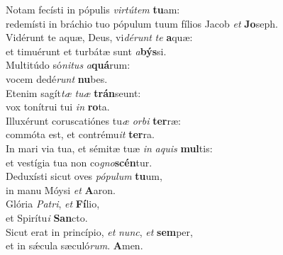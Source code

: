 \evenverse Notam fecísti in pópulis \textit{vir}\textit{tú}\textit{tem} \textbf{tu}am:~\*\\
\evenverse redemísti in bráchio tuo pópulum tuum fílios Jacob \textit{et} \textbf{Jo}seph.\\
\oddverse Vidérunt te aquæ, Deus, vi\textit{dé}\textit{runt} \textit{te} \textbf{a}quæ:~\*\\
\oddverse et timuérunt et turbátæ sunt \textit{a}\textbf{býs}si.\\
\evenverse Multitúdo só\textit{ni}\textit{tus} \textit{a}\textbf{quá}rum:~\*\\
\evenverse vocem dedé\textit{runt} \textbf{nu}bes.\\
\oddverse Etenim sagít\textit{tæ} \textit{tu}\textit{æ} \textbf{trán}seunt:~\*\\
\oddverse vox tonítrui tui \textit{in} \textbf{ro}ta.\\
\evenverse Illuxérunt coruscatiónes tu\textit{æ} \textit{or}\textit{bi} \textbf{ter}ræ:~\*\\
\evenverse commóta est, et contrému\textit{it} \textbf{ter}ra.\\
\oddverse In mari via tua, et sémitæ tuæ \textit{in} \textit{a}\textit{quis} \textbf{mul}tis:~\*\\
\oddverse et vestígia tua non co\textit{gno}\textbf{scén}tur.\\
\evenverse Deduxísti sicut oves \textit{pó}\textit{pu}\textit{lum} \textbf{tu}um,~\*\\
\evenverse in manu Móysi \textit{et} \textbf{A}aron.\\
\oddverse Glória \textit{Pa}\textit{tri}, \textit{et} \textbf{Fí}lio,~\*\\
\oddverse et Spirítu\textit{i} \textbf{San}cto.\\
\evenverse Sicut erat in princípio, \textit{et} \textit{nunc}, \textit{et} \textbf{sem}per,~\*\\
\evenverse et in sǽcula sæculó\textit{rum}. \textbf{A}men.\\
